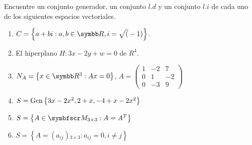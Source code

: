 \item Encuentre un conjunto generador, un conjunto \(l.d\) y un conjunto \(l.i\) de cada uno de los siguientes espacios vectoriales.
    \begin{enumerate}[label=\listAlph]
        \item \(C = \left\{a + bi: a,b \in \realR, i = \sqrt(-1)\right\}\).
        \item El hiperplano \(H: 3x - 2y + w = 0\) de \(R^4\).
        \item \(N_A = \left\{x \in \realR^3: Ax = 0\right\}\), 
            \(
                A = \left(\begin{smallmatrix}
                    1 & -2 & 7 \\
                    0 & 1 & -2 \\
                    0 & -3 & 9
                \end{smallmatrix}\right)
            \)
        \item \(S = \text{Gen} \left\{ 3x - 2x^2, 2 + x, -4 + x - 2x^2 \right\}\)
        \item \(S = \left\{A \in \fm_{3 \times 3}: A = A^T\right\}\)
        \item \(S = \left\{A = \left(a_{ij}\right){}_{3 \times 3}: a_{ij} = 0, i \neq j\right\}\)
    \end{enumerate}
